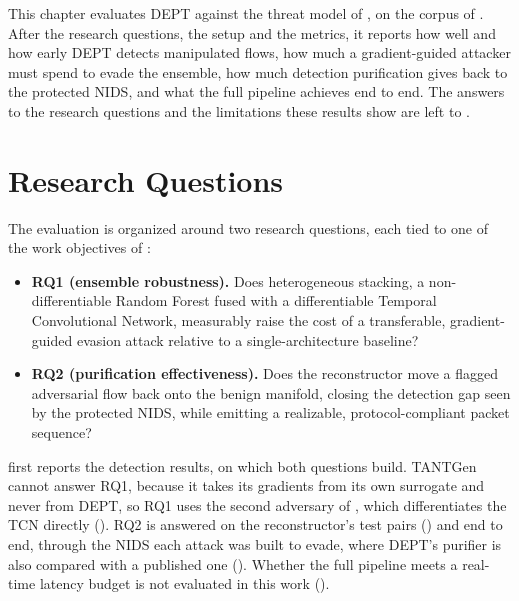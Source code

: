 \label{chap:evaluation}

This chapter evaluates DEPT against the threat model of , on the
corpus of . After the research questions, the setup and the
metrics, it reports how well and how early DEPT detects manipulated flows, how much a
gradient-guided attacker must spend to evade the ensemble, how much detection
purification gives back to the protected \ac{NIDS}, and what the full pipeline achieves
end to end. The answers to the research questions and the limitations these results
show are left to .

\section{Research Questions}\label{sec:eval-rqs}

The evaluation is organized around two research questions, each tied to one of the
work objectives of :

\begin{itemize}
    \item \textbf{RQ1 (ensemble robustness).} Does heterogeneous stacking, a
    non-differentiable Random Forest fused with a differentiable Temporal Convolutional
    Network, measurably raise the cost of a transferable, gradient-guided evasion attack
    relative to a single-architecture baseline?
    \item \textbf{RQ2 (purification effectiveness).} Does the reconstructor move a
    flagged adversarial flow back onto the benign manifold, closing the detection gap
    seen by the protected NIDS, while emitting a realizable, protocol-compliant packet
    sequence?
\end{itemize}

 first reports the detection results, on which both questions
build. TANTGen cannot answer RQ1, because it takes its gradients from its own surrogate
and never from DEPT, so RQ1 uses the second adversary of , which
differentiates the \ac{TCN} directly (). RQ2 is answered on the reconstructor's test
pairs () and end to end, through the \ac{NIDS} each attack
was built to evade, where DEPT's purifier is also compared with a published one
(). Whether the full pipeline meets a real-time latency budget is not
evaluated in this work ().

